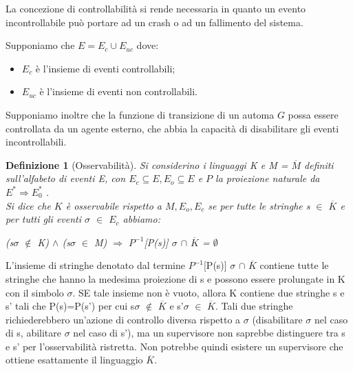 \documentclass[a4paper, 11pt]{article}
\newtheorem{definit}{Definizione}[subsection]
\begin{document}
La concezione di controllabilità si rende necessaria in quanto un evento incontrollabile può portare ad un crash o ad un fallimento del sistema. 

Supponiamo che $E = E_c \cup E_{uc}$ dove: \begin{itemize}
	\item $E_c$ è l'insieme di eventi controllabili;
	\item $E_{uc}$ è l'insieme di eventi non controllabili.
\end{itemize}

Supponiamo inoltre che la funzione di transizione di un automa $G$ possa essere controllata da un agente esterno, che abbia la capacità di disabilitare gli eventi incontrollabili.




\begin{definit}[Osservabilità]
Si considerino i linguaggi K e M = $\overline{M}$ definiti sull'alfabeto di eventi E, con $E_{c} \subseteq E, E_o \subseteq E$ e $P$ la proiezione naturale da $E^\ast \Rightarrow E_0^\ast$ .\\ Si dice che $K$ è osservabile rispetto a $M, E_{o},E_{c}$ se per tutte le stringhe s $\in$ $\overline{K}$ e per tutti gli eventi $\sigma$ $\in$ $E_c$ abbiamo: 
\begin{center}(s$\sigma$ $\notin$ K) $\land$ (s$\sigma$ $\in$ M) $\Rightarrow$ $P^{-1}$[P(s)] $\sigma$  $\cap$ $\overline{K}$ = $\emptyset$
\end{center}
\end{definit}
L'insieme di stringhe denotato dal termine $P^{-1}$[P(s)] $\sigma$  $\cap$ $\overline{K}$ contiene tutte le stringhe che hanno la medesima proiezione di s e possono essere prolungate in K con il simbolo $\sigma$. SE tale insieme non è vuoto, allora K contiene due stringhe s e s' tali che P(s)=P(s') per cui s$\sigma$ $\notin$ $\overline{K}$ e s'$\sigma$ $\in$ $\overline{K}$. Tali due stringhe richiederebbero un'azione di controllo diversa rispetto a $\sigma$ (disabilitare $\sigma$ nel caso di s, abilitare $\sigma$ nel caso di s'), ma un supervisore non saprebbe distinguere tra s e s' per l'osservabilità ristretta. Non potrebbe quindi esistere un supervisore che ottiene esattamente il linguaggio $\overline{K}$.
\end{document}
